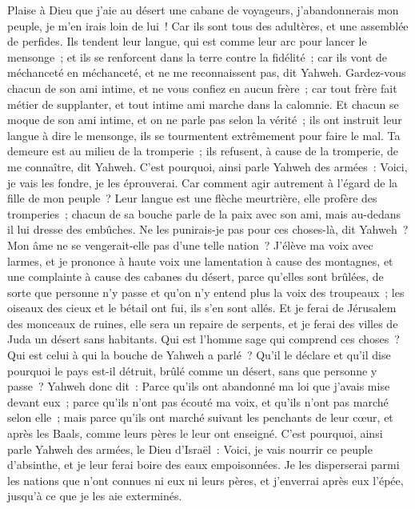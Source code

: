\begin{multicols}{2}
Plaise à Dieu que j'aie au désert une cabane de voyageurs, j'abandonnerais mon peuple, je m'en irais loin de lui~! Car ils sont tous des adultères, et une assemblée de perfides.
Ils tendent leur langue, qui est comme leur arc pour lancer le mensonge~; et ils se renforcent dans la terre contre la fidélité~; car ils vont de méchanceté en méchanceté, et ne me reconnaissent pas, dit Yahweh.
Gardez-vous chacun de son ami intime, et ne vous confiez en aucun frère~; car tout frère fait métier de supplanter, et tout intime ami marche dans la calomnie.
Et chacun se moque de son ami intime, et on ne parle pas selon la vérité~; ils ont instruit leur langue à dire le mensonge, ils se tourmentent extrêmement pour faire le mal.
Ta demeure est au milieu de la tromperie~; ils refusent, à cause de la tromperie, de me connaître, dit Yahweh.
C'est pourquoi, ainsi parle Yahweh des armées~: Voici, je vais les fondre, je les éprouverai. Car comment agir autrement à l'égard de la fille de mon peuple~?
Leur langue est une flèche meurtrière, elle profère des tromperies~; chacun de sa bouche parle de la paix avec son ami, mais au-dedans il lui dresse des embûches.
Ne les punirais-je pas pour ces choses-là, dit Yahweh~? Mon âme ne se vengerait-elle pas d'une telle nation~?
J'élève ma voix avec larmes, et je prononce à haute voix une lamentation à cause des montagnes, et une complainte à cause des cabanes du désert, parce qu'elles sont brûlées, de sorte que personne n'y passe et qu'on n'y entend plus la voix des troupeaux~; les oiseaux des cieux et le bétail ont fui, ils s'en sont allés.
Et je ferai de Jérusalem des monceaux de ruines, elle sera un repaire de serpents, et je ferai des villes de Juda un désert sans habitants.
Qui est l'homme sage qui comprend ces choses~? Qui est celui à qui la bouche de Yahweh a parlé~? Qu'il le déclare et qu'il dise pourquoi le pays est-il détruit, brûlé comme un désert, sans que personne y passe~?
Yahweh donc dit~: Parce qu'ils ont abandonné ma loi que j'avais mise devant eux~; parce qu'ils n'ont pas écouté ma voix, et qu'ils n'ont pas marché selon elle~;
mais parce qu'ils ont marché suivant les penchants de leur cœur, et après les Baals, comme leurs pères le leur ont enseigné.
C'est pourquoi, ainsi parle Yahweh des armées, le Dieu d'Israël~: Voici, je vais nourrir ce peuple d'absinthe, et je leur ferai boire des eaux empoisonnées.
Je les disperserai parmi les nations que n'ont connues ni eux ni leurs pères, et j'enverrai après eux l'épée, jusqu'à ce que je les aie exterminés.

\end{multicols}
